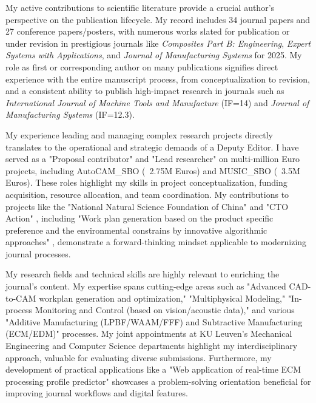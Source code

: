 \documentclass[a4paper,9pt]{article}
\begin{document}

My active contributions to scientific literature provide a crucial author's perspective on the publication lifecycle. My record includes 34 journal papers and 27 conference papers/posters, with numerous works slated for publication or under revision in prestigious journals like \textit{Composites Part B: Engineering}, \textit{Expert Systems with Applications}, and \textit{Journal of Manufacturing Systems} for 2025. My role as first or corresponding author on many publications signifies direct experience with the entire manuscript process, from conceptualization to revision, and a consistent ability to publish high-impact research in journals such as \textit{International Journal of Machine Tools and Manufacture} (IF=14) and \textit{Journal of Manufacturing Systems} (IF=12.3).


My experience leading and managing complex research projects directly translates to the operational and strategic demands of a Deputy Editor. I have served as a "Proposal contributor" and "Lead researcher" on multi-million Euro projects, including AutoCAM\_SBO (~2.75M Euros) and MUSIC\_SBO (~3.5M Euros). These roles highlight my skills in project conceptualization, funding acquisition, resource allocation, and team coordination. My contributions to projects like the "National Natural Science Foundation of China" and "CTO Action" , including "Work plan generation based on the product specific preference and the environmental constrains by innovative algorithmic approaches" , demonstrate a forward-thinking mindset applicable to modernizing journal processes. 


My research fields and technical skills are highly relevant to enriching the journal's content. My expertise spans cutting-edge areas such as "Advanced CAD-to-CAM workplan generation and optimization," "Multiphysical Modeling," "In-process Monitoring and Control (based on vision/acoustic data)," and various "Additive Manufacturing (LPBF/WAAM/FFF) and Subtractive Manufacturing (ECM/EDM)" processes. My joint appointments at KU Leuven's Mechanical Engineering and Computer Science departments  highlight my interdisciplinary approach, valuable for evaluating diverse submissions. Furthermore, my development of practical applications like a "Web application of real-time ECM processing profile predictor"  showcases a problem-solving orientation beneficial for improving journal workflows and digital features.
\end{document}
